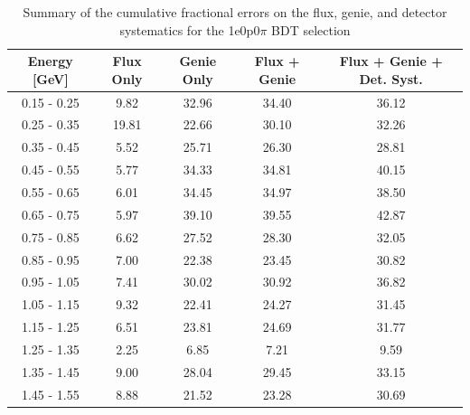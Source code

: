 \documentclass[a4paper]{article}
\begin{document}
\begin{table}[H]
\centering
 \begin{tabular}{| c | c | c | c | c |} 
\hline
Energy [GeV] & Flux Only & Genie Only  & Flux + Genie & Flux + Genie + Det. Syst. \\
\hline
0.15 - 0.25&9.82&32.96&34.40&36.12\\
0.25 - 0.35&19.81&22.66&30.10&32.26\\
0.35 - 0.45&5.52&25.71&26.30&28.81\\
0.45 - 0.55&5.77&34.33&34.81&40.15\\
0.55 - 0.65&6.01&34.45&34.97&38.50\\
0.65 - 0.75&5.97&39.10&39.55&42.87\\
0.75 - 0.85&6.62&27.52&28.30&32.05\\
0.85 - 0.95&7.00&22.38&23.45&30.82\\
0.95 - 1.05&7.41&30.02&30.92&36.82\\
1.05 - 1.15&9.32&22.41&24.27&31.45\\
1.15 - 1.25&6.51&23.81&24.69&31.77\\
1.25 - 1.35&2.25&6.85&7.21&9.59\\
1.35 - 1.45&9.00&28.04&29.45&33.15\\
1.45 - 1.55&8.88&21.52&23.28&30.69\\
\hline
\end{tabular}
\caption{Summary of the cumulative fractional errors on the flux, genie, and detector systematics for the 1e0p0$\pi$ BDT selection}
\label{tab:1e0p0pi_bdt_errors}
\end{table}
\end{document}
